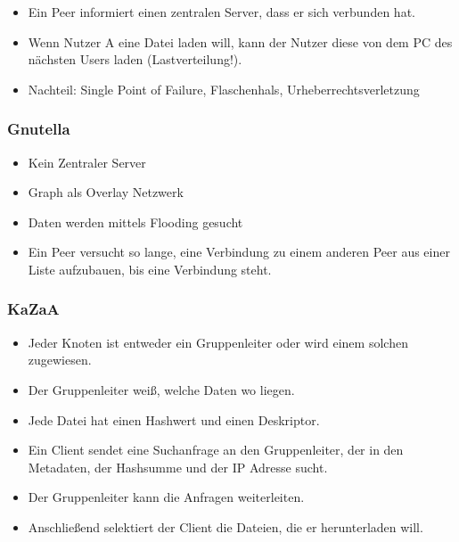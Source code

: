 \documentclass[a4paper, 11pt, accentcolor = tud3b]{tudreport}
\begin{document}
	                \begin{itemize}
	                	\item Ein Peer informiert einen zentralen Server, dass er sich verbunden hat.
	                	\item Wenn Nutzer A eine Datei laden will, kann der Nutzer diese von dem PC des nächsten Users laden (Lastverteilung!).
	                	\item Nachteil: Single Point of Failure, Flaschenhals, Urheberrechtsverletzung
	                \end{itemize}
                
                \subsubsection{Gnutella}
	                \begin{itemize}
	                	\item Kein Zentraler Server
	                	\item Graph als Overlay Netzwerk
	                	\item Daten werden mittels Flooding gesucht
	                	\item Ein Peer versucht so lange, eine Verbindung zu einem anderen Peer aus einer Liste aufzubauen, bis eine Verbindung steht.
	                \end{itemize}
                
                \subsubsection{KaZaA}
	                \begin{itemize}
	                	\item Jeder Knoten ist entweder ein Gruppenleiter oder wird einem solchen zugewiesen.
	                	\item Der Gruppenleiter weiß, welche Daten wo liegen.
	                	\item Jede Datei hat einen Hashwert und einen Deskriptor.
	                	\item Ein Client sendet eine Suchanfrage an den Gruppenleiter, der in den Metadaten, der Hashsumme und der IP Adresse sucht.
	                	\item Der Gruppenleiter kann die Anfragen weiterleiten.
	                	\item Anschließend selektiert der Client die Dateien, die er herunterladen will.
	                \end{itemize}
                
\end{document}
